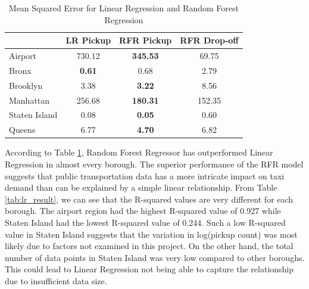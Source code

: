 \documentclass[11pt]{article}
\begin{document}
\begin{table}[]
\centering
\begin{tabular}{|l|c|c|c|}
\hline
              & LR Pickup     & RFR Pickup      & \multicolumn{1}{l|}{RFR Drop-off} \\ \hline
Airport       & 730.12        & \textbf{345.53} & 69.75                             \\ \hline
Bronx         & \textbf{0.61} & 0.68            & 2.79                              \\ \hline
Brooklyn      & 3.38          & \textbf{3.22}   & 8.56                              \\ \hline
Manhattan     & 256.68        & \textbf{180.31} & 152.35                            \\ \hline
Staten Island & 0.08          & \textbf{0.05}   & 0.60                              \\ \hline
Queens        & 6.77          & \textbf{4.70}   & 6.82                              \\ \hline
\end{tabular}
\caption{Mean Squared Error for Linear Regression and Random Forest Regression}
\label{tab:mae_result}
\end{table}

According to Table \ref{tab:mae_result}, Random Forest Regressor has outperformed Linear Regression in almost every borough. The superior performance of the RFR model suggests that public transportation data has a more intricate impact on taxi demand than can be explained by a simple linear relationship. From Table \ref{tab:lr_result}, we can see that the R-squared values are very different for each borough. The airport region had the highest R-squared value of 0.927 while Staten Island had the lowest R-squared value of 0.244. Such a low R-squared value in Staten Island suggests that the variation in log(pickup count) was most likely due to factors not examined in this project. On the other hand, the total number of data points in Staten Island was very low compared to other boroughs. This could lead to Linear Regression not being able to capture the relationship due to insufficient data size. 
\end{document}
